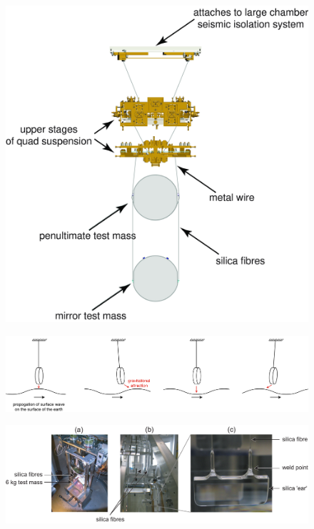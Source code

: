 \begin{figure}[]
\begin{center}
\includegraphics[width=1\columnwidth]{./figures/fig4/fig4}
\caption{ \protect}
\end{center}
\end{figure}


\begin{figure}[]
\begin{center}
\includegraphics[width=1\columnwidth]{./figures/GGN/GGN}
\caption{ \protect}
\end{center}
\end{figure}


\begin{figure}[]
\begin{center}
\includegraphics[width=1\columnwidth]{./figures/monolithic/monolithic}
\caption{ \protect}
\end{center}
\end{figure}

